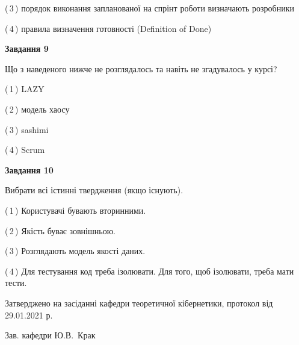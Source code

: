 \documentclass[10pt, ukrainian]{article}
\begin{document}
{\begin {large}
(\,3\,) порядок виконання запланованої на спрінт роботи визначають розробники%



(\,4\,) правила визначення готовності (Definition of Done) %


{\begin {center}\textbf{Завдання 9}\end {center}}\par
Що з наведеного нижче не розглядалось та навіть не згадувалось у курсі?\par
\vspace{2mm}



(\,1\,) LAZY%



(\,2\,) модель хаосу%



(\,3\,) sashimi%



(\,4\,) Scrum%


{\begin {center}\textbf{Завдання 10}\end {center}}\par
Вибрати всі істинні твердження (якщо існують).\par
\vspace{2mm}



(\,1\,) Користувачі бувають вторинними.%



(\,2\,) Якість буває зовнішньою.%



(\,3\,) Розглядають модель якості даних.%



(\,4\,) Для тестування код треба ізолювати. Для того, щоб ізолювати, треба мати тести.%



\end {large}}
{\vspace{5mm}\smallskip \begin {small} Затверджено на засіданні кафедри теоретичної кібернетики, протокол  від   29.01.2021 р.\par\smallskip\smallskip
{\parbox {6.5 cm}{Зав. кафедри \dotfill Ю.В.~Крак}} \end{small}}
\newpage
\end{document}
